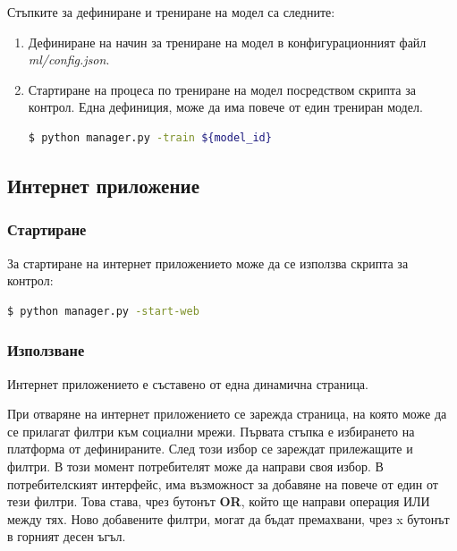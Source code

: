 \documentclass{article}
\begin{document}
Стъпките за дефиниране и трениране на модел са следните:

\begin{enumerate}
\item Дефиниране на начин за трениране на модел в конфигурационният файл \textit{ml/config.json}.
\item Стартиране на процеса по трениране на модел посредством скрипта за контрол. Една дефиниция, може да има повече
от един трениран модел.
\begin{lstlisting}[language=bash, numbers=none, caption=Обработка на набор от данни.]
$ python manager.py -train ${model_id}
\end{lstlisting}
\end{enumerate}

\subsection{Интернет приложение}

\subsubsection{Стартиране}

За стартиране на интернет приложението може да се използва скрипта за контрол:

\begin{lstlisting}[language=bash, numbers=none, caption=Стартиране на интернет приложението.]
$ python manager.py -start-web
\end{lstlisting}

\subsubsection{Използване}

Интернет приложението е съставено от една динамична страница.

При отваряне на интернет приложението се зарежда страница, на която може да се прилагат филтри към социални мрежи.
Първата стъпка е избирането на платформа от дефинираните. След този избор се зареждат прилежащите и филтри. В този
момент потребителят може да направи своя избор. В потребителският интерфейс, има възможност за добавяне на повече от
един от тези филтри. Това става, чрез бутонът \textbf{OR}, който ще направи операция ИЛИ между тях. Ново добавените
филтри, могат да бъдат премахвани, чрез x бутонът в горният десен ъгъл.
\end{document}
